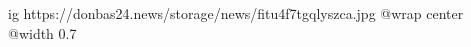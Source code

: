  
 
 
 
 

\ifcmt
  ig https://donbas24.news/storage/news/fitu4f7tgqlyszca.jpg
  @wrap center
  @width 0.7
\fi

